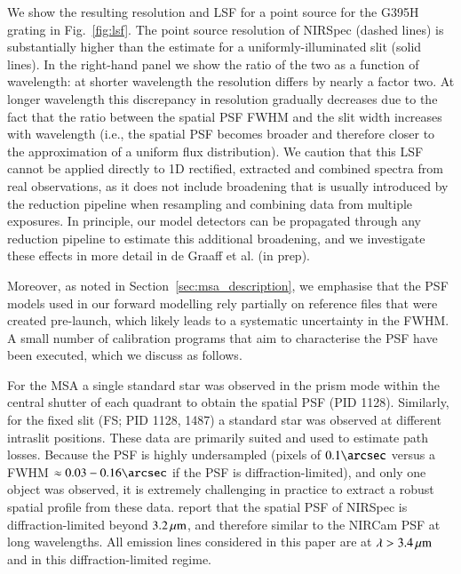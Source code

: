 \documentclass[longauth]{aa}
\newcommand{\micron}{\rm \mu m}
\begin{document}
\begin{appendix}
We show the resulting resolution and LSF for a point source for the G395H grating in Fig.~\ref{fig:lsf}. The point source resolution of NIRSpec (dashed lines) is substantially higher than the estimate for a uniformly-illuminated slit (solid lines). In the right-hand panel we show the ratio of the two as a function of wavelength: at shorter wavelength the resolution differs by nearly a factor two. At longer wavelength this discrepancy in resolution gradually decreases due to the fact that the ratio between the {spatial} PSF FWHM and the slit width increases with wavelength (i.e., the {spatial} PSF becomes broader and therefore closer to the approximation of a uniform flux distribution). We caution that this LSF cannot be applied directly to 1D rectified, extracted and combined spectra from real observations, as it does not include broadening that is usually introduced by the reduction pipeline {when resampling and combining} data from multiple exposures. In principle, our model detectors can be propagated through any reduction pipeline to estimate this additional broadening, and we investigate these effects in more detail in de Graaff et al. (in prep).

{Moreover, as noted in Section~\ref{sec:msa_description}, we emphasise that the PSF models used in our forward modelling rely partially on reference files that were created pre-launch, which likely leads to a systematic uncertainty in the FWHM. A small number of calibration programs that aim to characterise the PSF have been executed, which we discuss as follows.

For the MSA a single standard star was observed in the prism mode within the central shutter of each quadrant to obtain the spatial PSF (PID 1128). Similarly, for the fixed slit (FS; PID 1128, 1487) a standard star was observed at different intraslit positions. These data are primarily suited and used to estimate path losses. Because the PSF is highly undersampled (pixels of $0.1\arcsec$ versus a FWHM $\approx 0.03-0.16\arcsec$ if the PSF is diffraction-limited), and only one object was observed, it is extremely challenging in practice to extract a robust spatial profile from these data. \citet{Jakobsen2022} report that the spatial PSF of NIRSpec is diffraction-limited beyond $3.2\,\micron$, and therefore similar to the NIRCam PSF at long wavelengths. All emission lines considered in this paper are at $\lambda>3.4\,\micron$ and in this diffraction-limited regime.

}
\end{appendix}
\end{document}
